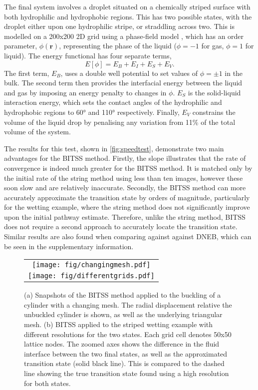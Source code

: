 \documentclass[aps,twocolumn]{revtex4}
\begin{document}
\topic The final system involves a droplet situated on a chemically striped surface with both hydrophilic and hydrophobic regions.
This has two possible states, with the droplet either upon one hydrophilic stripe, or straddling across two.
This is modelled on a 200x200 2D grid using a phase-field model \cite{Panter2019b}, which has an order parameter, $\phi(\bm{r})$, representing the phase of the liquid ($\phi=-1$ for gas, $\phi=1$ for liquid).
The energy functional has four separate terms,
\begin{equation}
  E[\phi] = E_B + E_I + E_S + E_V.
\end{equation}
The first term, $E_B$, uses a double well potential to set values of $\phi=\pm1$ in the bulk.
The second term then provides the interfacial energy between the liquid and gas by imposing an energy penalty to changes in $\phi$.
$E_S$ is the solid-liquid interaction energy, which sets the contact angles of the hydrophilic and hydrophobic regions to 60\si{\degree} and 110\si{\degree} respectively.
Finally, $E_V$ constrains the volume of the liquid drop by penalising any variation from 11\% of the total volume of the system.

\topic The results for this test, shown in \cref{fig:speedtest}, demonstrate two main advantages for the BITSS method.
Firstly, the slope illustrates that the rate of convergence is indeed much greater for the BITSS method.
It is matched only by the initial rate of the string method using less than ten images, however these soon slow and are relatively inaccurate.
Secondly, the BITSS method can more accurately approximate the transition state by orders of magnitude, particularly for the wetting example, where the string method does not significantly improve upon the initial pathway estimate.
Therefore, unlike the string method, BITSS does not require a second approach to accurately locate the transition state.
Similar results are also found when comparing against against DNEB, which can be seen in the supplementary information.


\begin{figure}[htb]
  \centering
  \begin{tabular}[b]{c}
    \texttt{[image: fig/changingmesh.pdf]}\\
    \texttt{[image: fig/differentgrids.pdf]}%
  \end{tabular}
  \caption{
    (a) Snapshots of the BITSS method applied to the buckling of a cylinder with a changing mesh.
        The radial displacement relative the unbuckled cylinder is shown, as well as the underlying triangular mesh.
    (b) BITSS applied to the striped wetting example with different resolutions for the two states.
        Each grid cell denotes 50x50 lattice nodes.
        The zoomed axes shows the difference in the fluid interface between the two final states, as well as the approximated transition state (solid black line).
        This is compared to the dashed line showing the true transition state found using a high resolution for both states.
  }
  \label{fig:adaptivemesh}
\end{figure}
\end{document}
